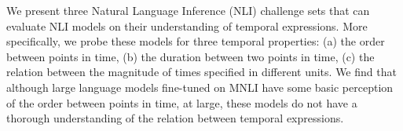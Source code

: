 We present three Natural Language Inference (NLI) challenge sets that can evaluate NLI models on their understanding of temporal expressions. More specifically, we probe these models for three temporal properties: (a) the order between points in time, (b) the duration between two points in time, (c) the relation between the magnitude of times specified in different units. We find that although large language models fine-tuned on MNLI have some basic perception of the order between points in time, at large, these models do not have a thorough understanding of the relation between temporal expressions.
